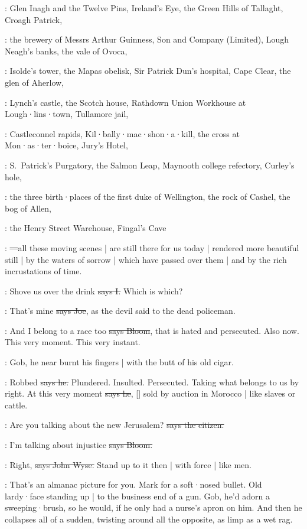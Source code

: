 :
Glen Inagh and the Twelve Pins,
Ireland's Eye,
the Green Hills of Tallaght,
Croagh Patrick,

:
the brewery of Messrs Arthur Guinness,
Son and Company (Limited),
Lough Neagh's banks,
the vale of Ovoca,

:
Isolde's tower,
the Mapas obelisk,
Sir Patrick Dun's hospital,
Cape Clear,
the glen of Aherlow,

:
Lynch's castle,
the Scotch house,
Rathdown Union Workhouse at Lough·lins·town,
Tullamore jail,

:
Castleconnel rapids,
Kil·bally·mac·shon·a·kill,
the cross at Mon·as·ter·boice,
Jury's Hotel,

:
S.~Patrick's Purgatory,
the Salmon Leap,
Maynooth college refectory,
Curley's hole,

:
the three birth·places of the first duke of Wellington,
the rock of Cashel,
the bog of Allen,

:
the Henry Street Warehouse,
Fingal's Cave

:
\sout{---}all these moving scenes |
are still there for us today |
rendered more beautiful still |
by the waters of sorrow |
which have passed over them |
and by the rich incrustations of time.

:
Shove us over the drink
\sout{says I.}
Which is which?

\joe:
That's mine
\sout{says Joe},
as the devil said to the dead policeman.

\Bloom:
And I belong to a race too
\sout{says Bloom},
that is hated and persecuted.
Also now.
This very moment.
This very instant.

\Nq:
Gob,
he near burnt his fingers |
with the butt of his old cigar.

\Bloom:
Robbed
\sout{says he.}
Plundered.
Insulted.
Persecuted.
Taking what belongs to us by right.
At this very moment
\sout{says he},
[]
sold by auction in Morocco |
like slaves or cattle.

\citizen:
Are you talking about the new Jerusalem?
\sout{says the citizen.}

\Bloom:
I'm talking about injustice
\sout{says Bloom.}

\johnwyse:
Right,
\sout{says John Wyse.}
Stand up to it then |
with force |
like men.

\Nq:
That's an almanac picture for you.
Mark for a soft·nosed bullet.
Old lardy·face standing up |
to the business end of a gun.
Gob,
he'd adorn a sweeping·brush,
so he would,
if he only had a nurse's apron on him.
And then he collapses all of a sudden,
twisting around all the opposite,
as limp as a wet rag.%

